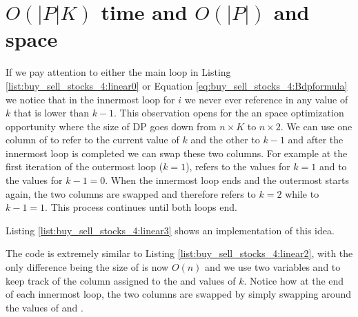 \section{$O(|P|K)$ time  and $O(|P|)$ and space}
If we pay attention to either the main loop in Listing \ref{list:buy_sell_stocks_4:linear0} or Equation \ref{eq:buy_sell_stocks_4:Bdpformula} we notice that in the innermost loop for $i$ we never ever reference in  any value of $k$ that is lower than $k-1$. This observation opens for the an space optimization opportunity where the size of DP goes down from  $n\times K$ to $n\times 2$. 
We can use one column of  to refer to the current value of $k$ and the other to $k-1$ and after the innermost loop is completed we can swap these two columns. For example at the first iteration of the outermost loop ($k=1$),  refers to the values for $k=1$ and  to the values for $k-1=0$. 
When the innermost loop ends  and the outermost starts again, the two columns are swapped and therefore  refers to $k=2$ while   to $k-1=1$. This process continues until both loops end.

Listing \ref{list:buy_sell_stocks_4:linear3} shows an implementation of this idea.



The code is extremely similar to Listing \ref{list:buy_sell_stocks_4:linear2}, with the only difference being the size of  is now $O(n)$ and we use two variables  and  to keep track of the column assigned to the  and  values of $k$. 
Notice how at the end of each innermost loop, the two columns are swapped by simply swapping around the values of  and .
